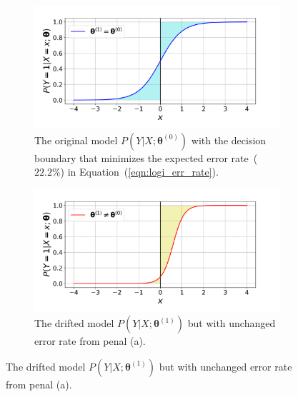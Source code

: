 \documentclass[twoside,11pt]{article}
\begin{document}
\begin{figure}[!htbp]
\centering
 \begin{subfigure}[t]{0.4\linewidth}
         \centering
         \includegraphics[width=\textwidth, trim=.2in .2in .7in .45in, clip]{../figures/v14/demons_fig/2D_logi_orig.png}
         \captionsetup{width=.95\linewidth}
         \caption{The original model $P(Y|{X};\bm{\theta}^{(0)})$ with the decision boundary that minimizes the expected error rate~($22.2\%$) in Equation~(\ref{eqn:logi_err_rate}).}
         \label{fig:logi_err_rate_unch_a}
  \end{subfigure}
  \begin{subfigure}[t]{0.4\linewidth}
         \centering
         \includegraphics[width=\textwidth, trim=.2in .2in .7in .45in, clip]{../figures/v14/demons_fig/2D_logi_cd.png}
         \captionsetup{width=.95\linewidth}
         \caption{The drifted model $P(Y|{X};\bm{\theta}^{(1)})$ but with unchanged error rate from penal (a).}
         \label{fig:logi_err_rate_unch_b}
  \end{subfigure}

\end{figure}
\end{document}
